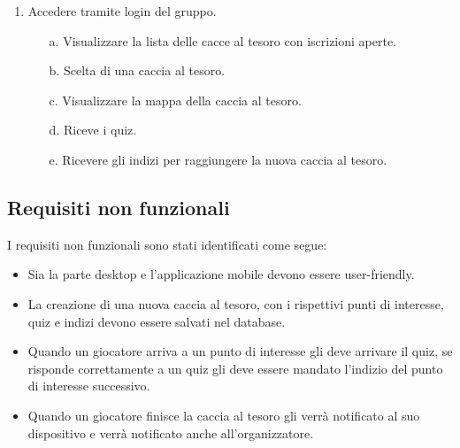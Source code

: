 \documentclass[12pt, italian]{article}
\begin{document}
\begin{itemize}
\begin{enumerate}
\begin{enumerate}
			\end{enumerate}
			\item Accedere tramite login del gruppo.
			\begin{enumerate}
				\item [a.] Visualizzare la lista delle cacce al tesoro con iscrizioni aperte.
				\item [b.] Scelta di una caccia al tesoro.
				\item [c.] Visualizzare la mappa della caccia al tesoro.
				\item [d.] Riceve i quiz.
				\item [e.] Ricevere gli indizi per raggiungere la nuova caccia al tesoro.
			\end{enumerate}
		\end{enumerate} 
\end{itemize}


\subsection{Requisiti non funzionali}
I requisiti non funzionali sono stati identificati come segue:
\begin{itemize}
	\item Sia la parte desktop e l'applicazione mobile devono essere user-friendly.
	\item La creazione di una nuova caccia al tesoro, con i rispettivi punti di interesse, quiz e indizi devono essere salvati nel database.
	\item Quando un giocatore arriva a un punto di interesse gli deve arrivare il quiz, se risponde correttamente a un quiz gli deve essere mandato l'indizio del punto di interesse successivo.
	\item Quando un giocatore finisce la caccia al tesoro gli verrà notificato al suo dispositivo e verrà notificato anche all'organizzatore.
\end{itemize}
\end{document}
